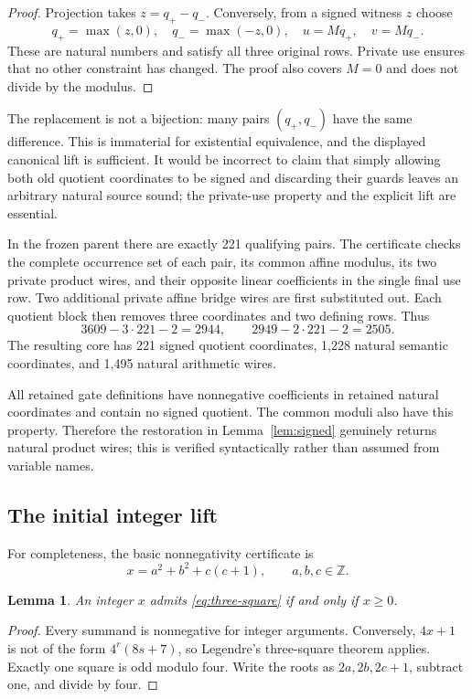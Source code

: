 \documentclass[11pt,letterpaper]{article}
\newtheorem{lemma}[theorem]{Lemma}
\theoremstyle{definition}
\newcommand{\Z}{\mathbb Z}
\begin{document}
\begin{proof}
Projection takes $z=q_+-q_-$. Conversely, from a signed witness $z$
choose
\[
q_+=\max(z,0),\quad q_-=\max(-z,0),\quad
u=Mq_+,\quad v=Mq_-.
\]
These are natural numbers and satisfy all three original rows. Private
use ensures that no other constraint has changed. The proof also covers
$M=0$ and does not divide by the modulus.
\end{proof}

The replacement is not a bijection: many pairs $(q_+,q_-)$ have the
same difference. This is immaterial for existential equivalence, and
the displayed canonical lift is sufficient. It would be incorrect to
claim that simply allowing both old quotient coordinates to be signed
and discarding their guards leaves an arbitrary natural source sound;
the private-use property and the explicit lift are essential.

In the frozen parent there are exactly 221 qualifying pairs. The
certificate checks the complete occurrence set of each pair, its common
affine modulus, its two private product wires, and their opposite linear
coefficients in the single final use row. Two additional private
affine bridge wires are first substituted out. Each quotient block
then removes three coordinates and two defining rows. Thus
\[
3609-3\cdot221-2=2944,\qquad
2949-2\cdot221-2=2505.
\]
The resulting core has 221 signed quotient coordinates, 1,228 natural
semantic coordinates, and 1,495 natural arithmetic wires.

All retained gate definitions have nonnegative coefficients in retained
natural coordinates and contain no signed quotient. The common moduli
also have this property. Therefore the restoration in
Lemma~\ref{lem:signed} genuinely returns natural product wires; this is
verified syntactically rather than assumed from variable names.

\subsection{The initial integer lift}

For completeness, the basic nonnegativity certificate is
\begin{equation}
\label{eq:three-square}
x=a^2+b^2+c(c+1),\qquad a,b,c\in\Z.
\end{equation}

\begin{lemma}
An integer $x$ admits \eqref{eq:three-square} if and only if $x\ge0$.
\end{lemma}
\begin{proof}
Every summand is nonnegative for integer arguments. Conversely,
$4x+1$ is not of the form $4^r(8s+7)$, so Legendre's three-square
theorem applies. Exactly one square is odd modulo four. Write the roots
as $2a,2b,2c+1$, subtract one, and divide by four.
\end{proof}
\end{document}
